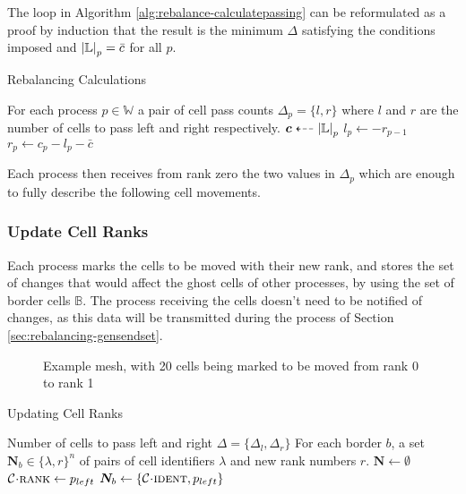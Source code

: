 \documentclass{IIBproject}
\newcommand{\grpath}{../../build/report/movecells}
\newcommand{\vect}[1]{\bm{#1}}
\newcommand{\dla}{\dashleftarrow}
\newcommand{\acc}{{\mkern 0.5mu\cdot\mkern 0.5mu}}
\begin{document}
The loop in Algorithm \ref{alg:rebalance-calculatepassing} can be reformulated as a proof by induction that the result is the minimum $\Delta$ satisfying the conditions imposed and $\abs{\mathbb{L}}_p=\bar c$ for all $p$.

\begin{algorithm}[H]
\caption{Rebalancing Calculations}
\label{alg:rebalance-calculatepassing}

\begin{algorithmic}
\Ensure For each process $p \in \mathbb{W}$ a pair of cell pass counts $\Delta_p = \{l,r\}$ where $l$ and $r$ are the number of cells to pass left and right respectively.
\Statex
\Gather $\vect{c} \dla \abs{\mathbb{L}}_p $
	\State $l_p \gets -r_{p-1}$
	\State $r_p \gets c_p - l_p - \bar{c}$
\EndFor
\end{algorithmic}
\end{algorithm}

Each process then receives from rank zero the two values in $\Delta_p$ which are enough to fully describe the following cell movements. 


\subsubsection{Update Cell Ranks}
\label{sec:rebalancing-updatecellranks}

Each process marks the cells to be moved with their new rank, and stores the set of changes that would affect the ghost cells of other processes, by using the set of border cells $\mathbb{B}$. The process receiving the cells doesn't need to be notified of changes, as this data will be transmitted during the process of Section \ref{sec:rebalancing-gensendset}.

\begin{figure}[H]
	\label{fig:rebalance-ranks}
	\caption{Example mesh, with 20 cells being marked to be moved from rank 0 to rank 1}
	
\end{figure}

\begin{algorithm}[H]
\caption{Updating Cell Ranks}
\label{alg:rebalance-updateranks}

\begin{algorithmic}
\Require Number of cells to pass left and right $\Delta = \{\Delta_l,\Delta_r\}$
\Ensure For each border $b$, a set $\vect{N}_b \in \{\lambda,r\}^n$ of pairs of cell identifiers $\lambda$ and new rank numbers $r$.
\Statex
\State $\vect{N} \gets \emptyset$
	\State $\mathcal{C} \acc \textproc{rank} \gets p_{left}$
			\State $\vect{N}_b \gets \{\mathcal{C} \acc \textproc{ident} , p_{left}\}$
		\EndIf
	\EndFor
\EndFor

\end{algorithmic}
\end{algorithm}
\end{document}
